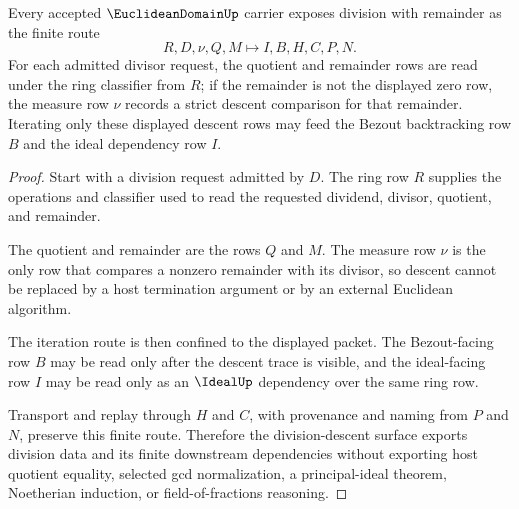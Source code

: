 \begin{theorem}
\label{thm:euclidean-domain-division-descent}
Every accepted $\EuclideanDomainUp$ carrier exposes division with remainder as the finite route
$$
R,D,\nu,Q,M \longmapsto I,B,H,C,P,N .
$$
For each admitted divisor request, the quotient and remainder rows are read under the ring classifier from $R$; if the remainder is not the displayed zero row, the measure row $\nu$ records a strict descent comparison for that remainder. Iterating only these displayed descent rows may feed the Bezout backtracking row $B$ and the ideal dependency row $I$.
\end{theorem}
\begin{proof}
Start with a division request admitted by $D$. The ring row $R$ supplies the operations and classifier used to read the requested dividend, divisor, quotient, and remainder.

The quotient and remainder are the rows $Q$ and $M$. The measure row $\nu$ is the only row that compares a nonzero remainder with its divisor, so descent cannot be replaced by a host termination argument or by an external Euclidean algorithm.

The iteration route is then confined to the displayed packet. The Bezout-facing row $B$ may be read only after the descent trace is visible, and the ideal-facing row $I$ may be read only as an $\IdealUp$ dependency over the same ring row.

Transport and replay through $H$ and $C$, with provenance and naming from $P$ and $N$, preserve this finite route. Therefore the division-descent surface exports division data and its finite downstream dependencies without exporting host quotient equality, selected gcd normalization, a principal-ideal theorem, Noetherian induction, or field-of-fractions reasoning.
\end{proof}



